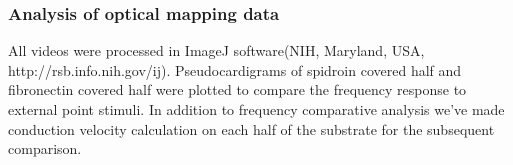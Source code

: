 \subsubsection{Analysis of optical mapping data}
All videos were processed in ImageJ software(NIH, Maryland, USA, http://rsb.info.nih.gov/ij). 
Pseudocardigrams of spidroin covered half and fibronectin covered half were plotted to compare the frequency response to external point stimuli.
In addition to frequency comparative analysis we've made conduction velocity calculation on each half of the substrate for the subsequent comparison.



